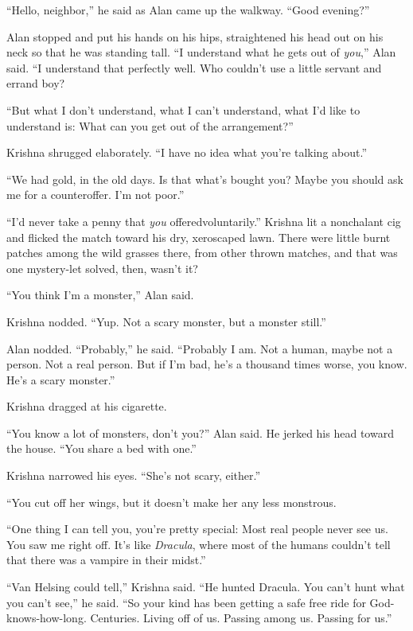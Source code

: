 ``Hello, neighbor,'' he said as Alan came up the walkway.  ``Good
evening?''

Alan stopped and put his hands on his hips, straightened his head out
on his neck so that he was standing tall.  ``I understand what he gets
out of \textit{you},'' Alan said.  ``I understand that perfectly well. 
Who couldn't use a little servant and errand boy?

``But what I don't understand, what I can't understand, what I'd like
to understand is:  What can you get out of the arrangement?''

Krishna shrugged elaborately.  ``I have no idea what you're talking
about.''

``We had gold, in the old days.  Is that what's bought you?  Maybe you
should ask me for a counteroffer.  I'm not poor.''

``I'd never take a penny that \textit{you} offered\dash{}voluntarily.''
Krishna lit a nonchalant cig and flicked the match toward his dry,
xeroscaped lawn.  There were little burnt patches among the wild
grasses there, from other thrown matches, and that was one mystery-let
solved, then, wasn't it?

``You think I'm a monster,'' Alan said.

Krishna nodded.  ``Yup.  Not a scary monster, but a monster still.''

Alan nodded.  ``Probably,'' he said.  ``Probably I am.  Not a human,
maybe not a person.  Not a real person.  But if I'm bad, he's a
thousand times worse, you know.  He's a scary monster.''

Krishna dragged at his cigarette.

``You know a lot of monsters, don't you?'' Alan said.  He jerked his
head toward the house.  ``You share a bed with one.''

Krishna narrowed his eyes.  ``She's not scary, either.''

``You cut off her wings, but it doesn't make her any less monstrous.

``One thing I can tell you, you're pretty special:  Most real people
never see us.  You saw me right off.  It's like \textit{Dracula},
where most of the humans couldn't tell that there was a vampire in
their midst.''

``Van Helsing could tell,'' Krishna said.  ``He hunted Dracula.  You
can't hunt what you can't see,'' he said.  ``So your kind has been
getting a safe free ride for God-knows-how-long.  Centuries.  Living
off of us.  Passing among us.  Passing for us.''

